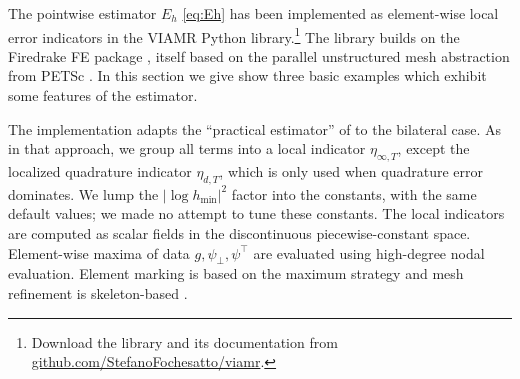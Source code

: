 \documentclass[12pt]{amsart}
\numberwithin{equation}{section}
\theoremstyle{plain}
\theoremstyle{definition}
\theoremstyle{remark}
\newcommand{\psilo}{\psi_\bot}
\newcommand{\psiup}{\psi^\top}
\begin{document}
The pointwise estimator $E_h$ \eqref{eq:Eh} has been implemented as element-wise local error indicators \cite{BangerthRannacher2003,Siebert2011} in the VIAMR Python library.\footnote{Download the library and its documentation from \href{https://github.com/StefanoFochesatto/viamr}{github.com/StefanoFochesatto/viamr}.}  The library builds on the Firedrake FE package \cite{Rathgeberetal2016}, itself based on the parallel unstructured mesh abstraction from PETSc \cite{Langeetal2016}.  In this section we give show three basic examples which exhibit some features of the estimator.

The implementation adapts the ``practical estimator'' of \cite[equation (7.1)]{NSV03} to the bilateral case.  As in that approach, we group all terms into a local indicator $\eta_{\infty,T}$, except the localized quadrature indicator $\eta_{d,T}$, which is only used when quadrature error dominates.  We lump the $|\log h_{\min}|^2$ factor into the constants, with the same default values; we made no attempt to tune these constants.  The local indicators are computed as scalar fields in the discontinuous piecewise-constant space.  Element-wise maxima of data $g,\psilo,\psiup$ are evaluated using high-degree nodal evaluation.  Element marking is based on the maximum strategy \cite{Siebert2011} and mesh refinement is skeleton-based \cite{PlazaCarey2000}.
\end{document}
